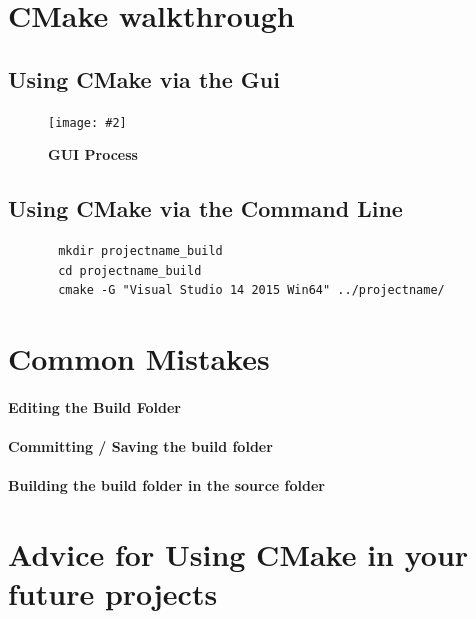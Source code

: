 \documentclass[11pt, a4paper]{article}
\newcommand{\figuremacro}[5]{
    \begin{figure}[#1]
        \centering
        \texttt{[image: \#2]}
        \caption[#3]{\textbf{#3}#4}
        \label{fig:#2}
    \end{figure}
}
\begin{document}
	\clearpage
    \section{CMake walkthrough}
    
       \subsection{Using CMake via the Gui}
	   \figuremacro{h}{01_cmake_over}{GUI Process}{ }{1.0}
	   \subsection{Using CMake via the Command Line}
	   
	   \begin{lstlisting}
	   mkdir projectname_build
	   cd projectname_build
	   cmake -G "Visual Studio 14 2015 Win64" ../projectname/
	   \end{lstlisting}
	   
	\clearpage
	\section{Common Mistakes}
		\paragraph{Editing the Build Folder}
		
		\paragraph{Committing / Saving the build folder}
		
		\paragraph{Building the build folder in the source folder}
		
	\section{Advice for Using CMake in your future projects}
\end{document}
